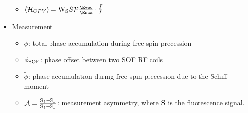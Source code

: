 \begin{itemize}
\begin{itemize}
        \item $\left\langle \mathcal{H}_{CPV} \right\rangle = {\rm W}_{\rm S} S \mathcal{P} \frac{\Evec}{\Esca}\cdot\frac{\vec{I}}{I}$
    \end{itemize}
    \item Measurement
    \begin{itemize}
        \item $\phi$: total phase accumulation during free spin precession
        \item $\phi_{\rm SOF}$: phase offset between two SOF RF coils
        \item $\widetilde{\phi}$: phase accumulation during free spin precession due to the Schiff moment
        \item $\mathcal{A} = \frac{{\rm S}_\uparrow - {\rm S}_\downarrow}{{\rm S}_\uparrow + {\rm S}_\downarrow}$: measurement asymmetry, where ${\rm S}$ is the fluorescence signal.
    \end{itemize}
\end{itemize}